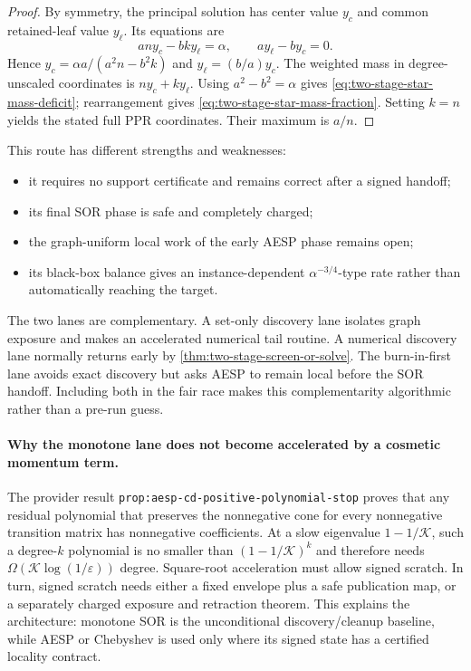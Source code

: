 \begin{proof}
By symmetry, the principal solution has center value $y_c$ and common
retained-leaf value $y_\ell$.  Its equations are
\begin{equation*}
 an y_c-bk y_\ell=\alpha,\qquad
 ay_\ell-by_c=0.
\end{equation*}
Hence
$y_c=\alpha a/(a^2n-b^2k)$ and $y_\ell=(b/a)y_c$.
The weighted mass in degree-unscaled coordinates is
$ny_c+ky_\ell$.  Using $a^2-b^2=\alpha$ gives
\cref{eq:two-stage-star-mass-deficit}; rearrangement gives
\cref{eq:two-stage-star-mass-fraction}.  Setting $k=n$ yields the stated full
PPR coordinates.  Their maximum is $a/n$.
\end{proof}

This route has different strengths and weaknesses:
\begin{itemize}[leftmargin=2.2em]
\item it requires no support certificate and remains correct after a signed
  handoff;
\item its final SOR phase is safe and completely charged;
\item the graph-uniform local work of the early AESP phase remains open;
\item its black-box balance gives an instance-dependent
  $\alpha^{-3/4}$-type rate rather than automatically reaching the target.
\end{itemize}

The two lanes are complementary.  A set-only discovery lane isolates graph
exposure and makes an accelerated numerical tail routine.  A numerical
discovery lane normally returns early by
\cref{thm:two-stage-screen-or-solve}.  The burn-in-first lane avoids exact
discovery but asks AESP to remain local before the SOR handoff.
Including both in the fair race makes this complementarity algorithmic rather
than a pre-run guess.

\paragraph{Why the monotone lane does not become accelerated by a cosmetic
momentum term.}
The provider result
\texttt{prop:aesp-cd-positive-polynomial-stop} proves that any residual
polynomial that preserves the nonnegative cone for every nonnegative
transition matrix has nonnegative coefficients.  At a slow eigenvalue
$1-1/\mathcal K$, such a degree-$k$ polynomial is no smaller than
$(1-1/\mathcal K)^k$ and therefore needs
$\Omega(\mathcal K\log(1/\varepsilon))$ degree.  Square-root acceleration
must allow signed scratch.  In turn, signed scratch needs either a fixed
envelope plus a safe publication map, or a separately charged exposure and
retraction theorem.  This explains the architecture: monotone SOR is the
unconditional discovery/cleanup baseline, while AESP or Chebyshev is used
only where its signed state has a certified locality contract.


